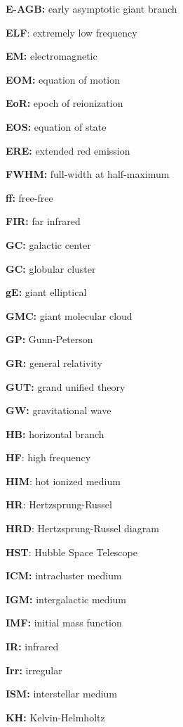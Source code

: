 \documentclass[a4paper,10pt]{article}
\begin{document}
{\noindent}\textbf{E-AGB:} early asymptotic giant branch

{\noindent}\textbf{ELF}: extremely low frequency

{\noindent}\textbf{EM:} electromagnetic

{\noindent}\textbf{EOM:} equation of motion

{\noindent}\textbf{EoR:} epoch of reionization

{\noindent}\textbf{EOS:} equation of state

{\noindent}\textbf{ERE:} extended red emission

{\noindent}\textbf{FWHM:} full-width at half-maximum

{\noindent}\textbf{ff:} free-free

{\noindent}\textbf{FIR:} far infrared

{\noindent}\textbf{GC:} galactic center

{\noindent}\textbf{GC:} globular cluster

{\noindent}\textbf{gE:} giant elliptical

{\noindent}\textbf{GMC:} giant molecular cloud

{\noindent}\textbf{GP:} Gunn-Peterson

{\noindent}\textbf{GR:} general relativity

{\noindent}\textbf{GUT:} grand unified theory

{\noindent}\textbf{GW:} gravitational wave

{\noindent}\textbf{HB:} horizontal branch

{\noindent}\textbf{HF}: high frequency

{\noindent}\textbf{HIM}: hot ionized medium

{\noindent}\textbf{HR}: Hertzsprung-Russel

{\noindent}\textbf{HRD}: Hertzsprung-Russel diagram

{\noindent}\textbf{HST}: Hubble Space Telescope

{\noindent}\textbf{ICM:} intracluster medium

{\noindent}\textbf{IGM:} intergalactic medium

{\noindent}\textbf{IMF:} initial mass function

{\noindent}\textbf{IR:} infrared

{\noindent}\textbf{Irr:} irregular

{\noindent}\textbf{ISM:} interstellar medium

{\noindent}\textbf{KH:} Kelvin-Helmholtz
\end{document}
